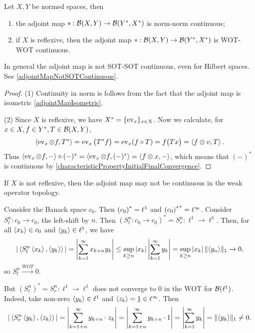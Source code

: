 \begin{proposition}
Let $X,Y$ be normed spaces, then
\begin{enumerate}
\item the adjoint map $*: \operatorname{\mathcal{B}}(X, Y) \to \operatorname{\mathcal{B}}({Y}^*, {X}^*)$ is norm-norm continuous;
\item if $X$ is reflexive, then the adjoint map $*: \operatorname{\mathcal{B}}(X, Y) \to \operatorname{\mathcal{B}}({Y}^*, {X}^*)$ is WOT-WOT continuous.
\end{enumerate}
\end{proposition}
In general the adjoint map is not SOT-SOT continuous, even for Hilbert spaces. See \ref{adjointMapNotSOTContinuous}.
\begin{proof}
(1) Continuity in norm is follows from the fact that the adjoint map is isometric \ref{adjointMapIsometric}.

(2) Since $X$ is reflexive, we have ${X}^*= \{\operatorname{ev}_x\}_{x\in X}$. Now we calculate, for $x\in X, f\in {Y}^*, T\in \operatorname{\mathcal{B}}(X,Y)$,
\[ \left\langle \operatorname{ev}_x\otimes f, T^* \right\rangle = \operatorname{ev}_x\big(T^*f\big) = \operatorname{ev}_x(f\circ T) = f\big(Tx\big) = \left\langle f\otimes v, T \right\rangle. \]
Thus $\left\langle \operatorname{ev}_x\otimes f, - \right\rangle\circ (-)^* = \left\langle \operatorname{ev}_x\otimes f, (-)^* \right\rangle = \left\langle f\otimes x, - \right\rangle$, which means that $(-)^*$ is continuous by \ref{characteristicPropertyInitialFinalConvergence}.
\end{proof}

\begin{example}
If $X$ is not reflexive, then the adjoint map may not be continuous in the weak operator topology.

Consider the Banach space $c_0$. Then ${(c_0)}^* = \ell^1$ and ${{(c_0)}^*}^* = \ell^\infty$. Consider $S_l^n: c_0 \to c_0$, the left-shift by $n$. Then $(S_l^n: c_0 \to c_0)^* = S_r^n: \ell^1 \to \ell^1$. Then, for all $\left\langle x_k \right\rangle \in c_0$ and $\left\langle y_k \right\rangle\in \ell^1$, we have
\[ |\left\langle S_l^n\left\langle x_k \right\rangle, \left\langle y_k \right\rangle \right\rangle| = \left|\sum_{k=1}^\infty x_{k+n}y_k \right| \leq \sup_{k\geq n}|x_k|\left|\sum_{k=1}^\infty y_k \right| = \sup_{k\geq n}|x_k|\,\lVert\left\langle y_n \right\rangle\rVert_1 \to 0, \]
so $S_l^n \overset{WOT}{\longrightarrow} 0$.

But $(S_l^n)^* = S_r^n: \ell^1\to \ell^1$ does not converge to $0$ in the WOT for $\operatorname{\mathcal{B}}(\ell^1)$. Indeed, take non-zero $\left\langle y_k \right\rangle\in \ell^1$ and $\left\langle z_k \right\rangle = \underline{1} \in \ell^\infty$.
Then
\[ |\left\langle S_r^n\left\langle y_k \right\rangle, \left\langle z_k \right\rangle \right\rangle| = \left|\sum_{k=1+n}^\infty y_{k+n}\cdot z_k \right| = \left|\sum_{k=1+n}^\infty y_{k+n}\cdot 1 \right| = \left|\sum_{k=1}^\infty y_{k} \right| = \lVert\left\langle y_k \right\rangle\rVert_1 \neq 0. \]
\end{example}

